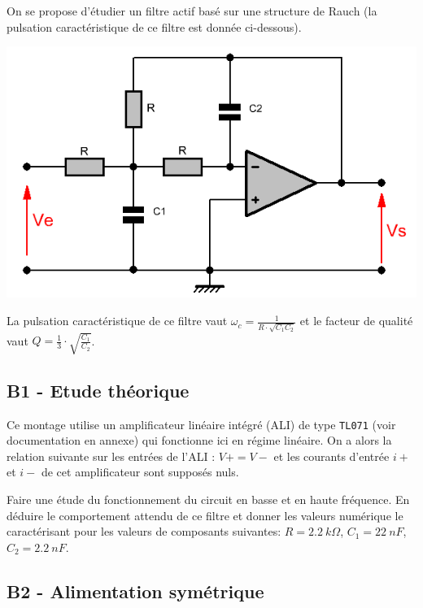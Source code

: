 \documentclass[a4paper,11pt]{article}
\begin{document}
On se propose d'étudier un filtre actif basé sur une structure de Rauch (la pulsation caractéristique de ce filtre est donnée ci-dessous).

\begin{center}
\includegraphics[scale=0.8]{images/rauch.png}
\end{center}

La pulsation caractéristique de ce filtre vaut $\omega_c = \frac{1}{R \cdot \sqrt{C_1 C_2}}$ et le facteur de qualité vaut $Q = \frac{1}{3} \cdot \sqrt{\frac{C_1}{C_2}}$.

%
\subsection*{B1 - Etude théorique}


Ce montage utilise un amplificateur linéaire intégré (ALI) de type \texttt{TL071} (voir documentation en annexe) qui fonctionne ici en régime linéaire. On a alors la relation suivante sur les entrées de l'ALI : $V+ = V-$ et les courants d'entrée $i+$ et $i-$ de cet amplificateur sont supposés nuls.

\Real Faire une étude du fonctionnement du circuit en basse et en haute fréquence. En déduire le comportement attendu de ce filtre et donner les valeurs numérique le caractérisant pour les valeurs de composants suivantes: $R = 2.2~k\Omega$, $C_1 = 22~nF$, $C_2 = 2.2~nF$. 

\subsection*{B2 - Alimentation symétrique}
\end{document}
